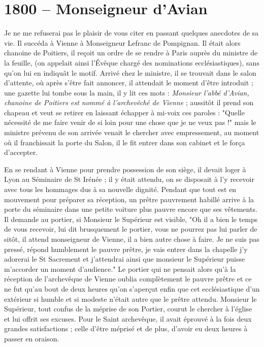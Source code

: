 \documentclass[11pt,a4paper]{report}
\begin{document}
\section*{1800 -- Monseigneur d'Avian}

Je ne me refuserai pas le plaisir de vous citer en passant quelques anecdotes de sa vie. Il succéda à Vienne à Monseigneur Lefranc de Pompignan. Il était alors chanoine de Poitiers, il reçoit un ordre de se rendre à Paris auprès du ministre de la feuille, (on appelait ainsi l'Évêque chargé des nominations ecclésiastiques), sans qu'on lui en indiquât le motif. Arrivé chez le ministre, il se trouvait dans le salon d'attente, où après s'être fait annoncer, il attendait le moment d'être introduit ; une gazette lui tombe sous la main, il y lit ces mots : \textit{Monsieur l'abbé d'Avian, chanoine de Poitiers est nommé à l'archevêché de Vienne} ; aussitôt il prend son chapeau et veut se retirer en laissant échapper à mi-voix ces paroles : "Quelle nécessité de me faire venir de si loin pour une chose que je ne veux pas !" mais le ministre prévenu de son arrivée venait le chercher avec empressement, au moment où il franchissait la porte du Salon, il le fit entrer dans son cabinet et le força d'accepter.

En se rendant à Vienne pour prendre possession de son siège, il devait loger à Lyon au Séminaire de St Irénée ; il y était attendu, on se disposait à l'y recevoir avec tous les hommages dus à sa nouvelle dignité. Pendant que tout est en mouvement pour préparer sa réception, un prêtre pauvrement habillé arrive à la porte du séminaire dans une petite voiture plus pauvre encore que ses vêtements. Il demande au portier, si Monsieur le Supérieur est visible, "Oh il a bien le temps de vous recevoir, lui dit brusquement le portier, vous ne pourrez pas lui parler de sitôt, il attend monseigneur de Vienne, il a bien autre chose à faire. Je ne suis pas pressé, répond humblement le pauvre prêtre, je vais entrer dans la chapelle j'y adorerai le St Sacrement et j'attendrai ainsi que monsieur le Supérieur puisse m'accorder un moment d'audience." Le portier qui ne pensait alors qu'à la réception de l'archevêque de Vienne oublia complètement le pauvre prêtre et ce ne fut qu'au bout de deux heures qu'on s'aperçut enfin que cet ecclésiastique d'un extérieur si humble et si modeste n'était autre que le prêtre attendu. Monsieur le Supérieur, tout confus de la méprise de son Portier, courut le chercher à l'église et lui offrit ses excuses. Pour le Saint archevêque, il avait éprouvé à la fois deux grandes satisfactions ; celle d'être méprisé et de plus, d'avoir eu deux heures à passer en oraison.
\end{document}
